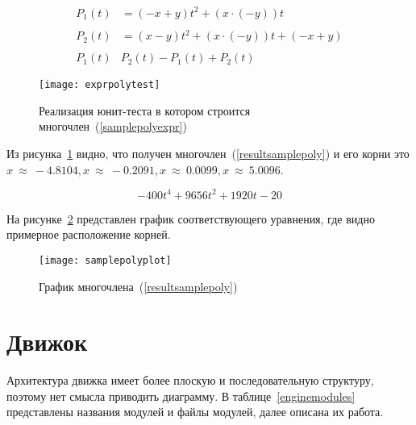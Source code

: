 \begin{align}\label{samplepolyexpr}
    P_1(t) & = (-x + y)t^2 + (x \cdot (-y))t \nonumber           \\
    & \nonumber\\
    P_2(t) & = (x - y)t^2 + (x \cdot (-y))t + (-x + y) \nonumber \\
    & \nonumber\\
    P_1(t) & P_2(t) - P_1(t) + P_2(t)
\end{align}

\begin{figure}[H]
    \centering
    \texttt{[image: exprpolytest]}
    \caption{Реализация юнит-теста в котором строится многочлен~(\ref{samplepolyexpr})\label{exprpolytestcode}}
\end{figure}

Из рисунка~\ref{exprpolytestcode} видно, что получен многочлен~(\ref{resultsamplepoly}) и его корни это \(x~\approx~-4.8104, x~\approx~-0.2091, x~\approx~0.0099, x~\approx~5.0096\).

\begin{equation}\label{resultsamplepoly}
    -400t^4 + 9656t^2 + 1920t - 20
\end{equation}

На рисунке~\ref{samplepolyplotfig} представлен график соответствующего уравнения, где видно примерное расположение корней.

\begin{figure}[H]
    \centering
    \texttt{[image: samplepolyplot]}
    \caption{График многочлена~(\ref{resultsamplepoly})\label{samplepolyplotfig}}
\end{figure}

\section{Движок}\label{engine}

Архитектура движка имеет более плоскую и последовательную структуру, поэтому нет смысла приводить диаграмму.
В таблице~\ref{enginemodules} представлены названия модулей и файлы модулей, далее описана их работа.

